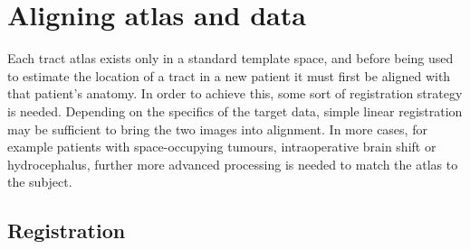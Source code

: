 \chapter{Aligning atlas and data}
\label{chap:reg}

Each tract atlas exists only in a standard template space, and before being used to estimate the location of a tract in a new patient it must first be aligned with that patient's anatomy.
In order to achieve this, some sort of registration strategy is needed.
Depending on the specifics of the target data, simple linear registration may be sufficient to bring the two images into alignment.
In more  cases, for example patients with space-occupying tumours, intraoperative brain shift or hydrocephalus, further more advanced processing is needed to match the atlas to the subject.

\section{Registration}


